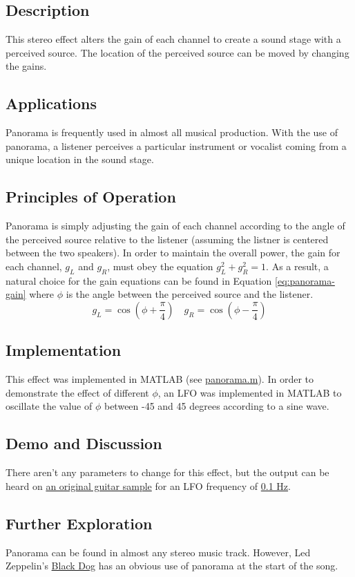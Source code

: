 \subsection{Description}
This stereo effect alters the gain of each channel to create a sound stage with a perceived source. The location of the perceived source can be moved by changing the gains.

\subsection{Applications}
Panorama is frequently used in almost all musical production. With the use of panorama, a listener perceives a particular instrument or vocalist coming from a unique location in the sound stage.

\subsection{Principles of Operation}
Panorama is simply adjusting the gain of each channel according to the angle of the perceived source relative to the listener (assuming the listner is centered between the two speakers). In order to maintain the overall power, the gain for each channel, $g_L$ and $g_R$, must obey the equation $g_L^2 + g_R^2 = 1$. As a result, a natural choice for the gain equations can be found in Equation \ref{eq:panorama-gain} where $\phi$ is the angle between the perceived source and the listener.
\begin{equation}
    g_L = \cos(\phi + \frac{\pi}{4}) \quad
    g_R = \cos(\phi - \frac{\pi}{4})
    \label{eq:panorama-gain}
\end{equation}

\subsection{Implementation}
This effect was implemented in MATLAB (see \href{run:panorama.m}{panorama.m}). In order to demonstrate the effect of different $\phi$, an LFO was implemented in MATLAB to oscillate the value of $\phi$ between -45 and 45 degrees according to a sine wave.

\subsection{Demo and Discussion}
There aren't any parameters to change for this effect, but the output can be heard on \href{run:../InputAudio/22-004 Original Guitar.wav}{an original guitar sample} for an LFO frequency of \href{run:../OutputAudio/panorama_22-004 Original Guitar_{f_LFO=0.1Hz}.wav}{0.1 Hz}.

\subsection{Further Exploration}
Panorama can be found in almost any stereo music track. However, Led Zeppelin's \href{https://www.youtube.com/watch?v=F0YoKzsjE-0}{Black Dog} has an obvious use of panorama at the start of the song.
